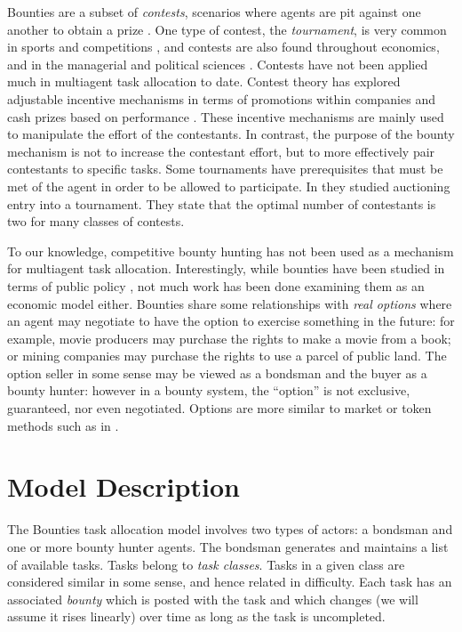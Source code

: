 \documentclass[letterpaper]{aamas2015}
\newcommand\citenauthor[1]{\citen{#1}}
\newcommand\citen[1]{\hbox{\cite{#1}}}
\begin{document}
Bounties are a subset of {\it contests}, scenarios where agents are pit against one another to obtain a prize \cite{Corchon:2007}.  One type of contest, the {\it tournament}, is very common in sports and competitions \cite{Connelly:2014}, and contests are also found throughout economics, and in the managerial and political sciences \cite{Konrad:2009}.  Contests have not been applied much in multiagent task allocation to date. Contest theory has explored adjustable incentive mechanisms in terms of promotions within companies and cash prizes based on performance \cite{Casas:2009,Nalebuff:1983,Terwiesch:2008}.  These incentive mechanisms are mainly used to manipulate the effort of the contestants.  In contrast, the purpose of the bounty mechanism is not to increase the contestant effort, but to more effectively pair contestants to specific tasks.  Some tournaments have prerequisites that must be met of the agent in order to be allowed to participate.  In \cite{Fullerton:1999} they studied auctioning entry into a tournament.  They state that the optimal number of contestants is two for many classes of contests.

To our knowledge, competitive bounty hunting has not been used as a mechanism for multiagent task allocation.    %
Interestingly, while bounties have been studied in terms of public policy \citen{Helland:2004},  not much work has been done examining them as an economic model either.  Bounties share some relationships with {\it real options} where an agent may negotiate to have the option to exercise something in the future: for example, movie producers may purchase the rights to make a movie from a book; or mining companies may purchase the rights to use a parcel of public land.   The option seller in some sense may be viewed as a bondsman and the buyer as a bounty hunter: however in a bounty system, the ``option'' is not exclusive, guaranteed, nor even negotiated.  Options are more similar to market or token methods such as in \citen{Farinelli:2005,Schneider:2005}.  


\section{Model Description}
The Bounties task allocation model involves two types of actors: a bondsman and one or more bounty hunter agents.  The bondsman generates and maintains a list of available tasks.  Tasks belong to {\it task classes}.  Tasks in a given class are considered similar in some sense, and hence related in difficulty.   Each task has an associated {\it bounty} which is posted with the task and which changes (we will assume it rises linearly) over time as long as the task is uncompleted.
\end{document}
